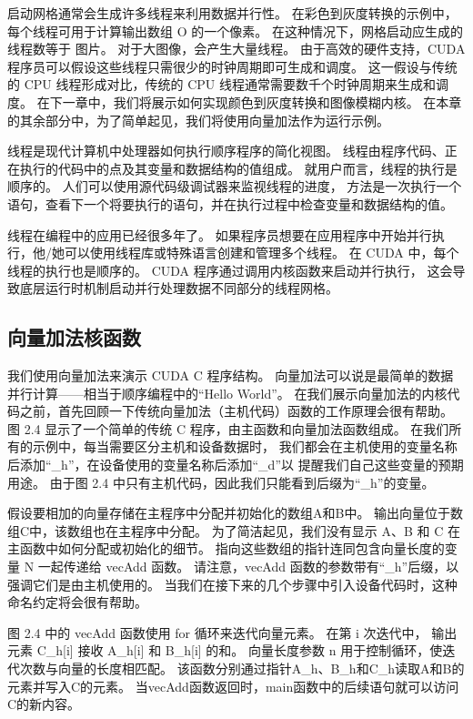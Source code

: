 启动网格通常会生成许多线程来利用数据并行性。 在彩色到灰度转换的示例中，每个线程可用于计算输出数组 O 的一个像素。
在这种情况下，网格启动应生成的线程数等于 图片。 对于大图像，会产生大量线程。 
由于高效的硬件支持，CUDA 程序员可以假设这些线程只需很少的时钟周期即可生成和调度。 
这一假设与传统的 CPU 线程形成对比，传统的 CPU 线程通常需要数千个时钟周期来生成和调度。 
在下一章中，我们将展示如何实现颜色到灰度转换和图像模糊内核。 
在本章的其余部分中，为了简单起见，我们将使用向量加法作为运行示例。

\begin{remark}[线程]
线程是现代计算机中处理器如何执行顺序程序的简化视图。 线程由程序代码、正在执行的代码中的点及其变量和数据结构的值组成。 
就用户而言，线程的执行是顺序的。 人们可以使用源代码级调试器来监视线程的进度，
方法是一次执行一个语句，查看下一个将要执行的语句，并在执行过程中检查变量和数据结构的值。

线程在编程中的应用已经很多年了。 如果程序员想要在应用程序中开始并行执行，他/她可以使用线程库或特殊语言创建和管理多个线程。 
在 CUDA 中，每个线程的执行也是顺序的。 CUDA 程序通过调用内核函数来启动并行执行，
这会导致底层运行时机制启动并行处理数据不同部分的线程网格。
\end{remark}

\subsection{向量加法核函数}
我们使用向量加法来演示 CUDA C 程序结构。 向量加法可以说是最简单的数据并行计算——相当于顺序编程中的“Hello World”。 
在我们展示向量加法的内核代码之前，首先回顾一下传统向量加法（主机代码）函数的工作原理会很有帮助。 
图 2.4 显示了一个简单的传统 C 程序，由主函数和向量加法函数组成。 在我们所有的示例中，每当需要区分主机和设备数据时，
我们都会在主机使用的变量名称后添加“\_h”，在设备使用的变量名称后添加“\_d”以 提醒我们自己这些变量的预期用途。 
由于图 2.4 中只有主机代码，因此我们只能看到后缀为“\_h”的变量。

假设要相加的向量存储在主程序中分配并初始化的数组A和B中。 输出向量位于数组C中，该数组也在主程序中分配。 
为了简洁起见，我们没有显示 A、B 和 C 在主函数中如何分配或初始化的细节。 
指向这些数组的指针连同包含向量长度的变量 N 一起传递给 vecAdd 函数。 
请注意，vecAdd 函数的参数带有“\_h”后缀，以强调它们是由主机使用的。 
当我们在接下来的几个步骤中引入设备代码时，这种命名约定将会很有帮助。

图 2.4 中的 vecAdd 函数使用 for 循环来迭代向量元素。 在第 i 次迭代中，
输出元素 C\_h[i] 接收 A\_h[i] 和 B\_h[i] 的和。 向量长度参数 n 用于控制循环，使迭代次数与向量的长度相匹配。 
该函数分别通过指针A\_h、B\_h和C\_h读取A和B的元素并写入C的元素。 
当vecAdd函数返回时，main函数中的后续语句就可以访问C的新内容。

